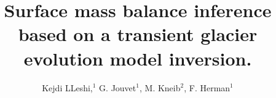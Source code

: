 \documentclass[review,jog]{igs}
\newcommand\dirbiblio{BIBLIO}
\begin{document}
 

	\title[Smb inference]{Surface mass balance inference based on a transient glacier evolution model inversion.}
	

	\author[LLeshi and others]{Kejdi LLeshi,$^1$ G. Jouvet$^{1}$, M. Kneib$^{2}$, F. Herman$^{1}$}
		
 
 
	\begin{frontmatter}

\maketitle




\end{frontmatter}
 
\captionsetup[subfigure]{labelformat=simple,labelsep=space}
\renewcommand\thesubfigure{\alph{subfigure}}

 
 



%




%
%
%
% 
% 
\end{document}
